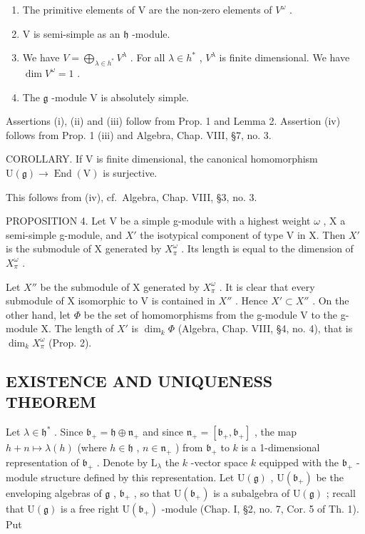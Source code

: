 \begin{enumerate}
\def\labelenumi{(\roman{enumi})}
\item
  The primitive elements of V are the non-zero elements of \(V^{\omega}\) .
\item
  V is semi-simple as an \(\mathfrak{h}\) -module.
\item
  We have \(V = \bigoplus_{\lambda \in h^{*}} V^{\lambda}\) . For all \(\lambda \in h^{*}\) , \(V^{\lambda}\) is finite dimensional. We have \(\dim V^{\omega} = 1\) .
\item
  The \(\mathfrak{g}\) -module V is absolutely simple.
\end{enumerate}

Assertions (i), (ii) and (iii) follow from Prop. 1 and Lemma 2. Assertion (iv) follows from Prop. 1 (iii) and Algebra, Chap. VIII, §7, no. 3.

COROLLARY. If \(\mathrm{V}\) is finite dimensional, the canonical homomorphism \(\mathrm{U}(\mathfrak{g}) \to \operatorname{End}(\mathrm{V})\) is surjective.

This follows from (iv), cf.~Algebra, Chap. VIII, §3, no. 3.

PROPOSITION 4. Let V be a simple g-module with a highest weight \(\omega\) , X a semi-simple g-module, and \(X'\) the isotypical component of type V in X. Then \(X'\) is the submodule of X generated by \(X_{\pi}^{\omega}\) . Its length is equal to the dimension of \(X_{\pi}^{\omega}\) .

Let \(X''\) be the submodule of X generated by \(X_{\pi}^{\omega}\) . It is clear that every submodule of X isomorphic to V is contained in \(X''\) . Hence \(X' \subset X''\) . On the other hand, let \(\varPhi\) be the set of homomorphisms from the g-module V to the g-module X. The length of \(X'\) is \(\dim_k \varPhi\) (Algebra, Chap. VIII, §4, no. 4), that is \(\dim_k X_{\pi}^{\omega}\) (Prop. 2).

\subsection{EXISTENCE AND UNIQUENESS THEOREM}

Let \(\lambda \in \mathfrak{h}^*\) . Since \(\mathfrak{b}_{+} = \mathfrak{h} \oplus \mathfrak{n}_{+}\) and since \(\mathfrak{n}_{+} = [\mathfrak{b}_{+}, \mathfrak{b}_{+}]\) , the map \(h + n \mapsto \lambda(h)\) (where \(h \in \mathfrak{h}\) , \(n \in \mathfrak{n}_{+}\) ) from \(\mathfrak{b}_{+}\) to \(k\) is a 1-dimensional representation of \(\mathfrak{b}_{+}\) . Denote by \(\mathrm{L}_{\lambda}\) the \(k\) -vector space \(k\) equipped with the \(\mathfrak{b}_{+}\) -module structure defined by this representation. Let \(\mathrm{U}(\mathfrak{g})\) , \(\mathrm{U}(\mathfrak{b}_{+})\) be the enveloping algebras of \(\mathfrak{g}\) , \(\mathfrak{b}_{+}\) , so that \(\mathrm{U}(\mathfrak{b}_{+})\) is a subalgebra of \(\mathrm{U}(\mathfrak{g})\) ; recall that \(\mathrm{U}(\mathfrak{g})\) is a free right \(\mathrm{U}(\mathfrak{b}_{+})\) -module (Chap. I, §2, no. 7, Cor. 5 of Th. 1). Put

